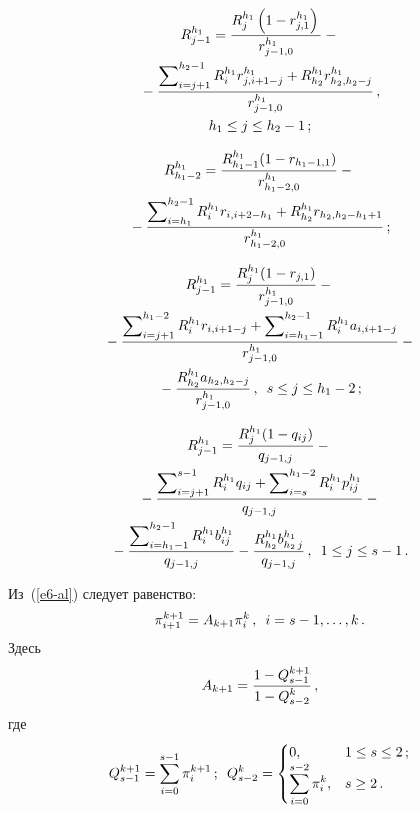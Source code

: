 \begin{multicols}{2}
  \vspace*{-12pt}
  
  \noindent
  \begin{multline*}
   R^{h_1}_{j-1}= \displaystyle\frac{\displaystyle R_j^{h_1} \left( 1-r^{h_1}_{j,1}\right)\mathstrut}{\displaystyle r^{h_1}_{j-1,0}\mathstrut}-{}\\
   {}-
\displaystyle\frac{\displaystyle \sum\nolimits_{i=j+1}^{h_2-1} R_i^{h_1} r^{h_1}_{j,i+1-j} +R^{h_1}_{h_2} r^{h_1}_{h_2, h_2-j}\mathstrut}{\displaystyle r^{h_1}_{j-1,0}\mathstrut}\,,\\
   h_1\leq j\leq h_2-1\,;
\end{multline*}

\vspace*{-12pt}

\noindent
   \begin{multline*}
   R^{h_1}_{h_1-2}= \displaystyle\frac{\displaystyle R^{h_1}_{h_1-1} (1-r_{h_1-1,1})\mathstrut}{\displaystyle r^{h_1}_{h_1-2,0}\mathstrut} -{}\\
   {}-\displaystyle\frac{\displaystyle \sum\nolimits^{h_2-1}_{i=h_1} R_i^{h_1} 
   r_{i,i+2-h_1} +R^{h_1}_{h_2} r_{h_2, h_2-h_1+1}\mathstrut}{\displaystyle r^{h_1}_{h_1-2,0}\mathstrut}\,;
   \end{multline*}
   
   
   \noindent
   \begin{multline*}
   R^{h_1}_{j-1}= \displaystyle\frac{\displaystyle R_j^{h_1}(1-r_{j,1})\mathstrut}{\displaystyle r^{h_1}_{j-1,0}\mathstrut} - {}\\
   {}-
   \displaystyle\frac{\displaystyle \sum\nolimits_{i=j+1}^{h_1-2} R_i^{h_1} r_{i,i+1-j} +
\sum\nolimits_{i=h_1-1}^{h_2-1} R_i^{h_1} a_{i,i+1-j}\mathstrut}{\displaystyle r^{h_1}_{j-1,0}\mathstrut}-{}\\
   {}- \displaystyle\frac{\displaystyle R^{h_1}_{h_2} a_{h_2,h_2-j}\mathstrut}{\displaystyle r^{h_1}_{j-1,0}\mathstrut}\,,\enskip s\leq j\leq h_1-2\,;
   \end{multline*}
   
   \vspace*{-12pt}
   
   \noindent
   \begin{multline*}
  R_{j-1}^{h_1}= \displaystyle\frac{\displaystyle R_j^{h_1}(1-q_{ij}) \mathstrut}{\displaystyle q_{j-1,j}\mathstrut}-{}\\
  {}-\displaystyle\frac{\displaystyle \sum\nolimits^{s-1}_{i=j+1} R_i^{h_1} q_{ij} + \sum\nolimits_{i=s}^{h_1-2} R_i^{h_1} p_{ij}^{h_1} \mathstrut}{\displaystyle q_{j-1,j}\mathstrut}-{}\\
  {}- \displaystyle\frac{\displaystyle \sum\nolimits_{i=h_1-
1}^{h_2-1} R_i^{h_1} b_{ij}^{h_1}\mathstrut}{\displaystyle q_{j-1,j}\mathstrut}- \displaystyle\frac{\displaystyle R_{h_2}^{h_1} b^{h_1}_{h_2\,j}\mathstrut}{\displaystyle q_{j-1,j}\mathstrut}\,,\enskip 1\leq j\leq s-1\,.
  \end{multline*}
  
  Из~(\ref{e6-al}) следует равенство:
  \begin{equation}
  \pi_{i+1}^{k+1} =A_{k+1} \pi_i^k\,,\enskip i=s-1, \ldots , k\,.
  \label{e7-al}
  \end{equation}
  Здесь
  $$
   A_{k+1}=\displaystyle\frac{\displaystyle 1-Q^{k+1}_{s-1}\mathstrut}{\displaystyle 1-Q_{s-2}^k\mathstrut}\,, 
$$
  где
  \begin{equation*}
   Q_{s-1}^{k+1} =\sum\limits_{i=0}^{s-1} \pi_i^{k+1}\,;\enskip 
    Q^k_{s-2} =  \begin{cases}
  0, & 1\leq s\leq 2\,;\\
  \displaystyle\sum\limits_{i=0}^{s-2} \pi_i^k, & s\geq 2\,.
  \end{cases}
  \end{equation*}


\end{multicols}
